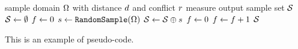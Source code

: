 \begin{algorithm}
  \begin{algorithmic}[1]
    \REQUIRE sample domain $\Omega$ with distance $d$ and conflict $r$ measure
    \ENSURE output sample set $\mathcal{S}{}$
    \STATE $\mathcal{S}{} \leftarrow \emptyset$
    \STATE $f \leftarrow 0$ 
    \STATE $s{} \leftarrow \texttt{RandomSample}(\Omega)$
    \IF{$\dist(\sample, \sampleprime) < \conflictdist(\sample, \sampleprime) \; \forall \sampleprime \in \sampleset$}
    \STATE $\mathcal{S}{} \leftarrow \mathcal{S}{} \oplus s{}$ 
    \STATE $f \leftarrow 0$
    \ELSE
    \STATE $f \leftarrow f + 1$
    \ENDIF
    \ENDWHILE
    \RETURN{} $\mathcal{S}{}$
  \end{algorithmic}
  {%
This is an example of pseudo-code.
  }
  \label{alg:dart_throw}
\end{algorithm}


